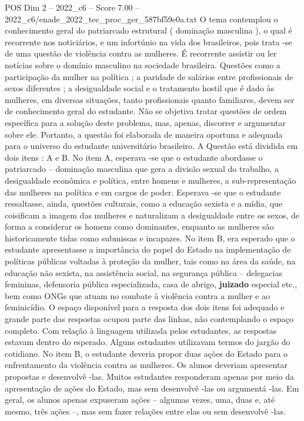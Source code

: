 \begin{textsample}{POS Dim 2 – 2022\_c6 – Score 7.00 – 2022\_c6/enade\_2022\_tec\_proc\_ger\_587bf59e0a.txt}
O tema contemplou o conhecimento geral do patriarcado estrutural ( dominação masculina ), o qual é recorrente nos noticiários, e um infortúnio na vida dos brasileiros, pois trata -se de uma questão de violência contra as mulheres.
É recorrente assistir ou ler notícias sobre o domínio masculino na sociedade brasileira.
Questões como a participação da mulher na política ; a paridade de salários entre profissionais de sexos diferentes ; a desigualdade social e o tratamento hostil que é dado às mulheres, em diversas situações, tanto profissionais quanto familiares, devem ser de conhecimento geral do estudante.
Não se objetiva tratar questões de ordem específica para a solução deste problema, mas, apenas, discorrer e argumentar sobre ele.
Portanto, a questão foi elaborada de maneira oportuna e adequada para o universo do estudante universitário brasileiro.
A Questão está dividida em dois itens : A e B.
No item A, esperava -se que o estudante abordasse o patriarcado – dominação masculina que gera a divisão sexual do trabalho, a desigualdade econômica e política, entre homens e mulheres, a sub-representação das mulheres na política e em cargos de poder.
Esperava -se que o estudante ressaltasse, ainda, questões culturais, como a educação sexista e a mídia, que coisificam a imagem das mulheres e naturalizam a desigualdade entre os sexos, de forma a considerar os homens como dominantes, enquanto as mulheres são historicamente tidas como submissas e incapazes.
No item B, era esperado que o estudante apresentasse a importância do papel do Estado na implementação de políticas públicas voltadas à proteção da mulher, tais como na área da saúde, na educação não sexista, na assistência social, na segurança pública – delegacias femininas, defensoria pública especializada, casa de abrigo, \textbf{juizado} especial etc., bem como ONGs que atuam no combate à violência contra a mulher e ao feminicídio.
O espaço disponível para a resposta dos dois itens foi adequado e grande parte das respostas ocupou parte das linhas, não contemplando o espaço completo.
Com relação à linguagem utilizada pelos estudantes, as respostas estavam dentro do esperado.
Alguns estudantes utilizavam termos do jargão do cotidiano.
No item B, o estudante deveria propor duas ações do Estado para o enfrentamento da violência contra as mulheres.
Os alunos deveriam apresentar propostas e desenvolvê -las.
Muitos estudantes responderam apenas por meio da apresentação de ações do Estado, mas sem desenvolvê -las ou argumentá -las.
Em geral, os alunos apenas expuseram ações – algumas vezes, uma, duas e, até mesmo, três ações –, mas sem fazer relações entre elas ou sem desenvolvê -las.

\end{textsample}
